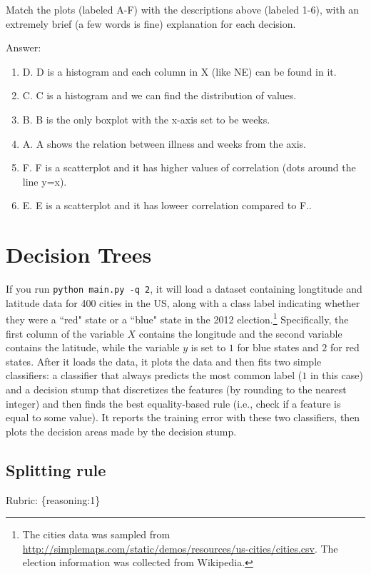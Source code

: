 \documentclass{article}
\def\blu#1{{\color{blu}#1}}
\def\gre#1{{\color{gre}#1}}
\def\enum#1{\begin{enumerate}#1\end{enumerate}}
\def\rubric#1{\gre{Rubric: \{#1\}}}{}
\begin{document}
\blu{Match the plots (labeled A-F) with the descriptions above (labeled 1-6), with an extremely brief (a few words is fine) explanation for each decision.}

\textcolor{gre}{
Answer:
\enum{
\item D. D is a histogram and each column in X (like NE) can be found in it.
\item C. C is a histogram and we can find the distribution of values.
\item B. B is the only boxplot with the x-axis set to be weeks.
\item A. A shows the relation between illness and weeks from the axis.
\item F. F is a scatterplot and it has higher values of correlation (dots around the line y=x).
\item E. E is a scatterplot and it has loweer correlation compared to F..
}
}





\section{Decision Trees}

If you run \texttt{python main.py -q 2}, it will load a dataset containing longtitude and latitude data for 400 cities in the US, along with a class label indicating whether they were a ``red" state or a ``blue" state in the 2012 election.\footnote{The cities data was sampled from \url{http://simplemaps.com/static/demos/resources/us-cities/cities.csv}. The election information was collected from Wikipedia.}
Specifically, the first column of the variable $X$ contains the longitude and the second variable contains the latitude,
while the variable $y$ is set to $1$ for blue states and $2$ for red states.
After it loads the data, it plots the data and then fits two simple classifiers: a classifier that always predicts the
most common label ($1$ in this case) and a decision stump
that discretizes the features (by rounding to the nearest integer)
and then finds the best equality-based rule (i.e., check
 if a feature is equal to some value).
It reports the training error with these two classifiers, then plots the decision areas made by the decision stump.

\subsection{Splitting rule}
\rubric{reasoning:1}
\end{document}
